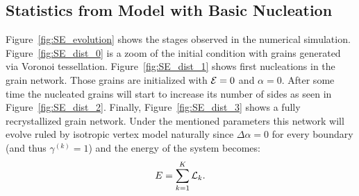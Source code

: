 \subsection{Statistics from Model with Basic Nucleation}
\label{sec:stats_basicnucl}

Figure~\ref{fig:SE_evolution} shows the stages observed in the numerical simulation. Figure~\ref{fig:SE_dist_0} is a zoom of the initial condition with  grains generated via Voronoi tessellation. 
Figure~\ref{fig:SE_dist_1} shows first nucleations in the grain network. Those grains are initialized with $\mathcal{E} = 0$ and $\alpha = 0$. After some time the nucleated grains will start to increase its number of sides as seen in Figure~\ref{fig:SE_dist_2}. Finally, Figure~\ref{fig:SE_dist_3} shows a fully recrystallized grain network. Under the mentioned parameters this network will evolve ruled by isotropic vertex model naturally since $\Delta \alpha = 0$ for every boundary (and thus $\gamma^{(k)} = 1$) and the energy of the system becomes:
\begin{equation}
    E = \sum_{k=1}^K \mathcal{L}_k.
    \label{eq:vertex_energy}
\end{equation}

